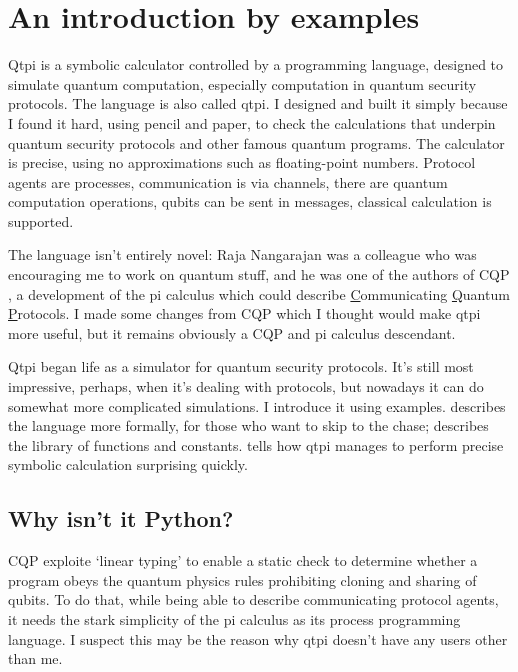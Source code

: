 
\chapter{An introduction by examples}

Qtpi is a symbolic calculator controlled by a programming language, designed to simulate quantum computation, especially computation in quantum security protocols. The language is also called qtpi.
I designed and built it simply because I found it hard, using pencil and paper, to check the calculations that underpin quantum security protocols and other famous quantum programs. The calculator is precise, using no approximations such as floating-point numbers. Protocol agents are processes, communication is via channels, there are quantum computation operations, qubits can be sent in messages, classical calculation is supported. 

The language isn't entirely novel: Raja Nangarajan was a colleague who was encouraging me to work on quantum stuff, and he was one of the authors of CQP \citep{GaySJ:comqp}, a development of the pi calculus \citep{DBLP:journals/iandc/MilnerPW92a} which could describe \underline{C}ommunicating \underline{Q}uantum \underline{P}rotocols. I made some changes from CQP which I thought would make qtpi more useful, but it remains obviously a CQP and pi calculus descendant. 

Qtpi began life as a simulator for quantum security protocols. It's still most impressive, perhaps, when it's dealing with protocols, but nowadays it can do somewhat more complicated simulations. I introduce it using examples.  describes the language more formally, for those who want to skip to the chase;  describes the library of functions and constants.  tells how qtpi manages to perform precise symbolic calculation surprising quickly.

\section{Why isn't it Python?}

CQP exploite `linear typing' \citep{linearityandthepi-calculus} to enable a static check to determine whether a program obeys the quantum physics rules prohibiting cloning and sharing of qubits. To do that, while being able to describe communicating protocol agents, it needs the stark simplicity of the pi calculus as its process programming language. I suspect this may be the reason why qtpi doesn't have any users other than me.

